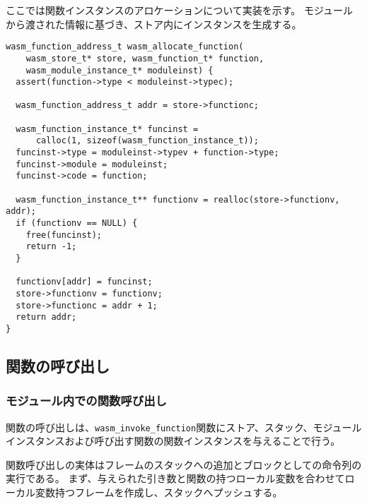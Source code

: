 ここでは関数インスタンスのアロケーションについて実装を示す。
モジュールから渡された情報に基づき、ストア内にインスタンスを生成する。

\begin{lstlisting}[caption=関数インスタンスのアロケーション,label=lst:parse_sleb128]
wasm_function_address_t wasm_allocate_function(
    wasm_store_t* store, wasm_function_t* function,
    wasm_module_instance_t* moduleinst) {
  assert(function->type < moduleinst->typec);

  wasm_function_address_t addr = store->functionc;

  wasm_function_instance_t* funcinst =
      calloc(1, sizeof(wasm_function_instance_t));
  funcinst->type = moduleinst->typev + function->type;
  funcinst->module = moduleinst;
  funcinst->code = function;

  wasm_function_instance_t** functionv = realloc(store->functionv, addr);
  if (functionv == NULL) {
    free(funcinst);
    return -1;
  }

  functionv[addr] = funcinst;
  store->functionv = functionv;
  store->functionc = addr + 1;
  return addr;
}
\end{lstlisting}

\subsection{関数の呼び出し}

\subsubsection{モジュール内での関数呼び出し}

関数の呼び出しは、\verb|wasm_invoke_function|関数にストア、スタック、モジュールインスタンスおよび呼び出す関数の関数インスタンスを与えることで行う。

関数呼び出しの実体はフレームのスタックへの追加とブロックとしての命令列の実行である。
まず、与えられた引き数と関数の持つローカル変数を合わせてローカル変数持つフレームを作成し、スタックへプッシュする。

